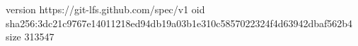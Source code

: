 version https://git-lfs.github.com/spec/v1
oid sha256:3dc21c9767e14011218ed94db19a03b1e310c5857022324f4d63942dbaf562b4
size 313547
